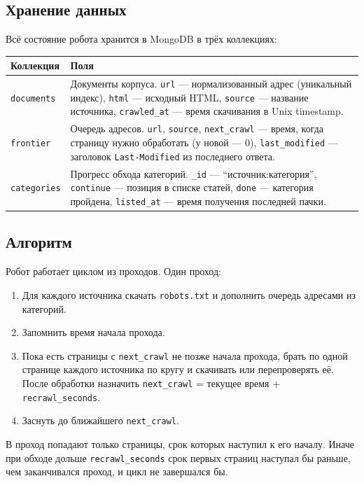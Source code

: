 \documentclass[12pt,a4paper,oneside,fleqn]{article}
\begin{document}
\subsection{Хранение данных}

Всё состояние робота хранится в MongoDB в трёх коллекциях:

\begin{longtable}{|p{2.6cm}|p{12.4cm}|}
\hline
\textbf{Коллекция} & \textbf{Поля} \\
\hline
\texttt{documents} & Документы корпуса. \texttt{url} --- нормализованный адрес (уникальный индекс), \texttt{html} --- исходный HTML, \texttt{source} --- название источника, \texttt{crawled\_at} --- время скачивания в Unix timestamp. \\
\hline
\texttt{frontier} & Очередь адресов. \texttt{url}, \texttt{source}, \texttt{next\_crawl} --- время, когда страницу нужно обработать (у новой --- 0), \texttt{last\_modified} --- заголовок \texttt{Last-Modified} из последнего ответа. \\
\hline
\texttt{categories} & Прогресс обхода категорий. \texttt{\_id} --- \enquote{источник:категория}, \texttt{continue} --- позиция в списке статей, \texttt{done} --- категория пройдена, \texttt{listed\_at} --- время получения последней пачки. \\
\hline
\end{longtable}

\subsection{Алгоритм}

Робот работает циклом из проходов. Один проход:

\begin{enumerate}
    \item Для каждого источника скачать \texttt{robots.txt} и дополнить очередь адресами из категорий.
    \item Запомнить время начала прохода.
    \item Пока есть страницы с \texttt{next\_crawl} не позже начала прохода, брать по одной странице каждого источника по кругу и скачивать или перепроверять её. После обработки назначить \texttt{next\_crawl} = текущее время + \texttt{recrawl\_seconds}.
    \item Заснуть до ближайшего \texttt{next\_crawl}.
\end{enumerate}

В проход попадают только страницы, срок которых наступил к его началу. Иначе при обходе дольше \texttt{recrawl\_seconds} срок первых страниц наступал бы раньше, чем заканчивался проход, и цикл не завершался бы.
\end{document}
